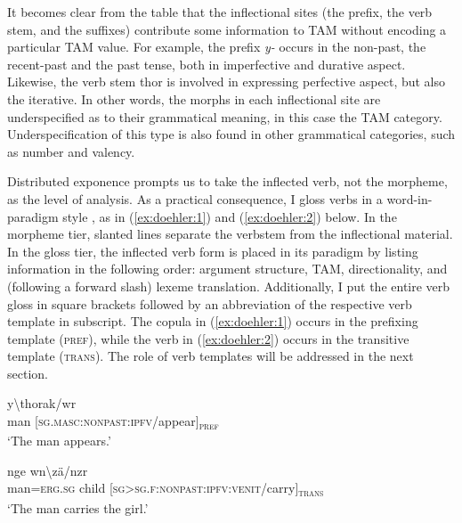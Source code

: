 \documentclass[output=paper]{langscibook}
\begin{document}
It becomes clear from the table that the inflectional sites (the prefix, the verb stem, and the suffixes) contribute some information to TAM without encoding a particular TAM value. For example, the prefix \emph{y-} occurs in the non-past, the recent-past and the past tense, both in imperfective and durative aspect. Likewise, the verb stem {thor} is involved in expressing perfective aspect, but also the iterative. In other words, the morphs in each inflectional site are underspecified as to their grammatical meaning, in this case the TAM category. Underspecification of this type is also found in other grammatical categories, such as number and valency.

Distributed exponence prompts us to take the inflected verb, not the morpheme, as the level of analysis. As a practical consequence, I gloss verbs in a word-in-paradigm style \citep{Matthews1974}, as in (\ref{ex:doehler:1}) and (\ref{ex:doehler:2}) below. In the morpheme tier, slanted lines separate the verbstem from the inflectional material. In the gloss tier, the inflected verb form is placed in its paradigm by listing information in the following order: argument structure, TAM, directionality, and (following a forward slash) lexeme translation. Additionally, I put the entire verb gloss in square brackets followed by an abbreviation of the respective verb template in subscript. The copula in (\ref{ex:doehler:1}) occurs in the prefixing template (\textsc{pref}), while the verb in (\ref{ex:doehler:2}) occurs in the transitive template (\textsc{trans}). The role of verb templates will be addressed in the next section.

\ea
\label{ex:doehler:1}
	 {y\textbackslash{thorak}/wr}\\
	man [\textsc{sg}.\textsc{masc}:\textsc{nonpast}:\textsc{ipfv}/appear]\textsubscript{\textsc{pref}}\\
	\glt `The man appears.'
	\z
	
\ea \label{ex:doehler:2}
	 {nge} {wn\textbackslash{zä}/nzr}\\
	man=\textsc{erg}.\textsc{sg}{} child [\textsc{sg}>\textsc{sg}.\textsc{f}:\textsc{nonpast}:\textsc{ipfv}:\textsc{venit}/carry]\textsubscript{\textsc{trans}}\\
	\glt `The man carries the girl.'
\z
\end{document}
